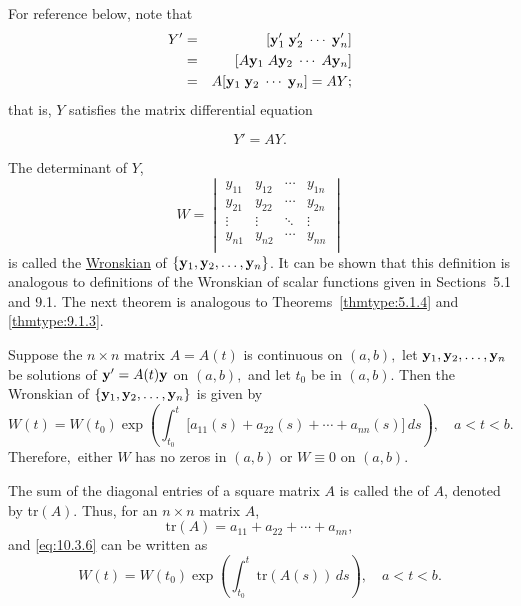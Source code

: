 \documentclass{ximera}
\begin{document}
For reference below, note that
\begin{eqnarray*}
Y'&=&[{\bf y}_1'\; {\bf y}_2'\; \cdots\; {\bf y}_n']\\
&=&[A{\bf y}_1\; A{\bf y}_2\; \cdots\; A{\bf y}_n]\\
&=&A[{\bf y}_1\; {\bf y}_2\; \cdots\; {\bf y}_n]=AY;
\end{eqnarray*}
that is, $Y$ satisfies the matrix differential equation

$$
Y'=AY.
$$

The determinant of $Y$,
\begin{equation} \label{eq:10.3.5}
W=\begin{vmatrix}
y_{11}&y_{12}&\cdots&y_{1n} \\
y_{21}&y_{22}&\cdots&y_{2n}\\
\vdots&\vdots&\ddots&\vdots \\
y_{n1}&y_{n2}&\cdots&y_{nn} \\
\end{vmatrix}
\end{equation}
is called the
\href{http://www-history.mcs.st-and.ac.uk/Mathematicians/Wronski.html}{Wronskian} of $\{{\bf y}_1,{\bf y}_2,\dots,{\bf
y}_n\}$. It can be shown 
that this definition is analogous to definitions of the Wronskian of
scalar functions given in Sections~5.1 and 9.1.
The next theorem is analogous to
Theorems~\ref{thmtype:5.1.4} and
\ref{thmtype:9.1.3}. %

\begin{theorem} \label{thmtype:10.3.2}
Suppose the $n\times n$ matrix $A=A(t)$ is continuous on $(a,b),$ let
${\bf y}_1, {\bf y}_2, \dots, {\bf y}_n$ be solutions of ${\bf
y}'=A(t){\bf y}$ on $(a,b),$ and let $t_0$ be in $(a,b)$. Then the
Wronskian of $\{{\bf y}_1,{\bf y}_2,\dots,{\bf y}_n\}$ is given by
\begin{equation} \label{eq:10.3.6}
W(t)=W(t_0)\exp\left(
\int^t_{t_0}\big[a_{11}(s)+a_{22}(s)+\cdots+a_{nn}(s)]\,
ds\right), \quad  a < t < b.
\end{equation}
Therefore$,$  either $W$ has no zeros in  $(a,b)$ or $W\equiv0$
on  $(a,b).$
\end{theorem}

\begin{remark}
The sum of the diagonal entries of a square matrix $A$ is called the
 of $A$, denoted by tr$(A)$. Thus, for an $n\times n$
matrix $A$,
$$
\mbox{tr}(A)=a_{11}+a_{22}+\cdots+a_{nn},
$$
and  \eqref{eq:10.3.6} can be written as
$$
W(t)=W(t_0)\exp\left(
\int^t_{t_0}\mbox{tr}(A(s))\,
ds\right), \quad a < t < b.
$$
\end{remark}
\end{document}
